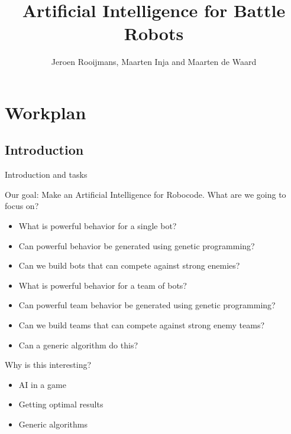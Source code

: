 \documentclass{beamer}
\title{Artificial Intelligence for Battle Robots}
\author{Jeroen Rooijmans, Maarten Inja and Maarten de Waard}
\institute{UvA}
\newcommand{\slide}[2]
{
\begin{frame}
\begin{block}{#1} 

#2

\end{block} 
\end{frame}
}
\begin{document}
\begin{frame}
\titlepage %
\end{frame}
\begin{frame}
 \Large\tableofcontents
\end{frame}




\section*{Workplan}
\subsection{Introduction}
\slide{Introduction and tasks}{
Our goal: Make an Artificial Intelligence for Robocode. What are we going to focus on?
\begin{itemize} 
 \item What is powerful behavior for a single bot?
 \item Can powerful behavior be generated using genetic programming?
 \item Can we build bots that can compete against strong enemies?
 \item What is powerful behavior for a team of bots?
 \item Can powerful team behavior be generated using genetic programming?
 \item Can we build teams that can compete against strong enemy teams?
 \item Can a generic algorithm do this?
\end{itemize}
}



\slide{Why is this interesting?}{
\begin{itemize}
 \item AI in a game
 \item Getting optimal results
 \item Generic algorithms
\end{itemize}
}
\end{document}
